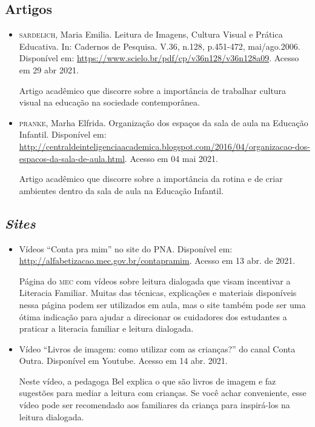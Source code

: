 \documentclass[11pt]{extarticle}
\begin{document}
\subsection{Artigos}

\begin{itemize}
\item \textsc{sardelich}, Maria Emilia. Leitura de Imagens, Cultura Visual e Prática Educativa. 
In: Cadernos de Pesquisa. V.36, n.128, p.451-472, mai/ago.2006. Disponível em: \url{https://www.scielo.br/pdf/cp/v36n128/v36n128a09}. 
Acesso em 29 abr 2021. 

Artigo acadêmico que discorre sobre a importância de trabalhar cultura 
visual na educação na sociedade contemporânea. 

\item \textsc{pranke}, Marha Elfrida. Organização dos espaços da sala de aula na Educação Infantil. Disponível em: \url{http://centraldeinteligenciaacademica.blogspot.com/2016/04/organizacao-dos-espacos-da-sala-de-aula.html}. Acesso em 04 mai 2021. 

Artigo acadêmico que discorre sobre a importância da rotina e de criar ambientes dentro da sala de aula na Educação Infantil.  
\end{itemize}

\subsection{\textit{Sites}}

\begin{itemize}
\item Vídeos “Conta pra mim” no site do PNA. Disponível em: \url{http://alfabetizacao.mec.gov.br/contapramim}. 
Acesso em 13 abr. de 2021.

Página do \textsc{mec} com vídeos sobre leitura dialogada que visam incentivar a Literacia Familiar. Muitas das 
técnicas, explicações e materiais disponíveis nessa página podem ser utilizados em aula, mas o site também 
pode ser uma ótima indicação para ajudar a direcionar os cuidadores dos estudantes a praticar 
a literacia familiar e leitura dialogada.

\item Vídeo “Livros de imagem: como utilizar com as crianças?” do canal Conta Outra. Disponível em Youtube. 
Acesso em 14 abr. 2021. 

Neste vídeo, a pedagoga Bel explica o que são livros de imagem e faz sugestões para mediar a leitura com 
crianças. Se você achar conveniente, esse vídeo pode ser recomendado aos familiares da criança 
para inspirá-los na leitura dialogada. 
\end{itemize}
\end{document}
